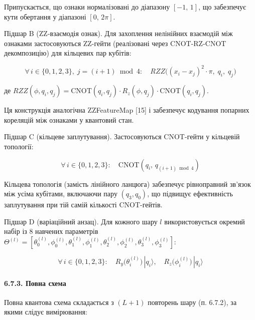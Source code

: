\documentclass[12pt,a4paper]{article}
\begin{document}
Припускається, що ознаки нормалізовані до діапазону \([-1,\,1]\), що забезпечує кути обертання у діапазоні \([0,\,2\pi]\).



Підшар B (ZZ-взаємодія ознак). Для захоплення нелінійних взаємодій між ознаками застосовуються ZZ-гейти (реалізовані через CNOT-RZ-CNOT декомпозицію) для кільцевих пар кубітів:



\[\forall\,i \in \{0,1,2,3\},\;j = (i+1) \bmod 4:\quad RZZ\bigl((x_i - x_j)^2 \cdot \pi,\;q_i,\;q_j\bigr)\]



де \(RZZ(\phi, q_i, q_j) = \text{CNOT}(q_i, q_j) \cdot R_z(\phi, q_j) \cdot \text{CNOT}(q_i, q_j)\).



Ця конструкція аналогічна ZZFeatureMap {[}15{]} і забезпечує кодування попарних кореляцій між ознаками у квантовий стан.



Підшар C (кільцеве заплутування). Застосовуються CNOT-гейти у кільцевій топології:



\[\forall\,i \in \{0,1,2,3\}:\quad \text{CNOT}(q_i,\,q_{(i+1) \bmod 4})\]



Кільцева топологія (замість лінійного ланцюга) забезпечує рівноправний зв'язок між усіма кубітами, включаючи пару \((q_3, q_0)\), що підвищує ефективність заплутування при тій самій кількості CNOT-гейтів.



Підшар D (варіаційний анзац). Для кожного шару \(l\) використовується окремий набір із 8 навчених параметрів \(\Theta^{(l)} = [\theta_0^{(l)}, \phi_0^{(l)}, \theta_1^{(l)}, \phi_1^{(l)}, \theta_2^{(l)}, \phi_2^{(l)}, \theta_3^{(l)}, \phi_3^{(l)}]\):



\[\forall\,i \in \{0,1,2,3\}:\quad R_y\bigl(\theta_i^{(l)}\bigr)\,|q_i\rangle, \quad R_z\bigl(\phi_i^{(l)}\bigr)\,|q_i\rangle\]



\paragraph{6.7.3. Повна схема}\label{ux43fux43eux432ux43dux430-ux441ux445ux435ux43cux430}



Повна квантова схема складається з \((L + 1)\) повторень шару (п. 6.7.2), за якими слідує вимірювання:
\end{document}
